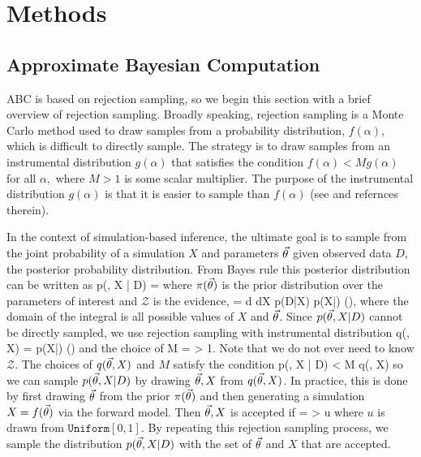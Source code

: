 \section{Methods}\label{sec:method}
\subsection{Approximate Bayesian Computation} \label{sec:abc}
ABC is based on rejection sampling, so we begin this section with a brief overview of 
rejection sampling. Broadly speaking, rejection sampling is a Monte Carlo method 
used to draw samples from a probability distribution, $f(\alpha)$, which is difficult to directly sample. The strategy is to draw samples from an instrumental distribution $g(\alpha)$ that satisfies the condition $f(\alpha) < M g(\alpha)$ for all $\alpha,$ where $M > 1$ is some scalar multiplier. The purpose of the instrumental distribution $g(\alpha)$ is that it is easier to sample than $f(\alpha)$ (see \citealt{bishop} and refernces therein). 

In the context of simulation-based inference, 
the ultimate goal is to sample from the joint probability of a
simulation $X$ and parameters $\vec{\theta}$ given observed data $D$, the
posterior probability distribution. From Bayes rule this posterior 
distribution can be written as 
\beq
p(\pars, X | D) = 
\eeq
where $\pi(\vec{\theta})$ is the prior distribution over the parameters of 
interest and $\mathcal{Z}$ is the evidence, 
\beq
{} = \int d\pars \; dX\; p(D|X) p(X|\pars) \pi(\pars), 
\eeq
where the domain of the integral is all possible values of $X$ and $\vec{\theta}$. 
Since $p(\vec{\theta}, X | D)$ cannot be directly sampled, we use rejection 
sampling with instrumental distribution 
\beq
q(\pars, X) = p(X|\pars) \pi(\pars)
\eeq
and the choice of 
\beq
M =  > 1.
\eeq
Note that we do not ever need to know $\mathcal{Z}$. 
The choices of $q(\vec{\theta}, X)$ and $M$ satisfy the condition 
\beq
p(\pars, X | D) < M q(\pars, X)
\eeq
so we can sample $p(\vec{\theta}, X | D)$ by drawing ${\vec{\theta}, X}$ from $q(\vec{\theta}, X)$.
In practice, this is done 
by first drawing $\vec{\theta}$ from the prior $\pi(\vec{\theta})$ and then generating a 
simulation $X = f(\vec{\theta})$ via the forward model. Then ${\vec{\theta}, X}$ 
is accepted if
\beq \label{eq:reject_samp}
 =  > u 
\eeq
where $u$ is drawn from $\mathtt{Uniform}[0,1]$. By repeating this rejection sampling process, 
we sample the distribution $p(\vec{\theta}, X |D)$ with the set of $\vec{\theta}$ and $X$ that are accepted. 

